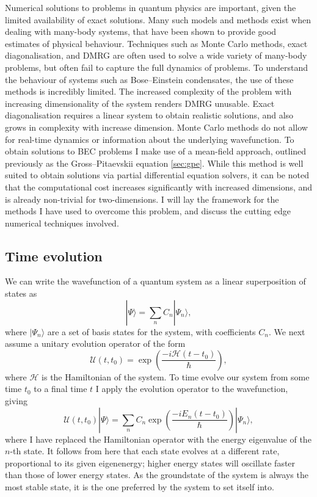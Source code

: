 Numerical solutions to problems in quantum physics are important, given the limited availability of exact solutions. Many such models and methods exist when dealing with many-body systems, that have been shown to provide good estimates of physical behaviour. Techniques such as Monte Carlo methods, exact diagonalisation, and DMRG are often used to solve a wide variety of many-body problems, but often fail to capture the full dynamics of problems. To understand the behaviour of systems such as Bose--Einstein condensates, the use of these methods is incredibly limited. The increased complexity of the problem with increasing dimensionality of the system renders DMRG unusable. Exact diagonalisation requires a linear system to obtain realistic solutions, and also grows in complexity with increase dimension. Monte Carlo methods do not allow for real-time dynamics or information about the underlying wavefunction. To obtain solutions to BEC problems I make use of a mean-field approach, outlined previously as the Gross--Pitaevskii equation \ref{sec:gpe}. While this method is well suited to obtain solutions via partial differential equation solvers, it can be noted that the computational cost increases significantly with increased dimensions, and is already non-trivial for two-dimensions. I will lay the framework for the methods I have used to overcome this problem, and discuss the cutting edge numerical techniques involved.


\subsection{Time evolution}
We can write the wavefunction of a quantum system as a linear superposition of states as
\begin{equation}
    |\Psi \rangle = \displaystyle\sum\limits_{n} C_n |\Psi_n \rangle,
\end{equation}
where $| \Psi_n \rangle$ are a set of basis states for the system, with coefficients $C_n$. We next assume a unitary evolution operator of the form
\begin{equation}
   \mathscr{U}(t,t_0) = \exp\left(\frac{-i\mathcal{H}(t-t_0)}{\hbar}\right),
\end{equation}
where $\mathcal{H}$ is the Hamiltonian of the system. To time evolve our system from some time $t_0$ to a final time $t$ I apply the evolution operator to the wavefunction, giving
\begin{equation}
   \mathscr{U}(t,t_0)|\Psi \rangle = \displaystyle\sum\limits_{n} C_n \exp\left(\frac{-i{E_n}(t-t_0)}{\hbar}\right)|\Psi_n \rangle,
\end{equation}
where I have replaced the Hamiltonian operator with the energy eigenvalue of the $n$-th state. It follows from here that each state evolves at a different rate, proportional to its given eigenenergy; higher energy states will oscillate faster than those of lower energy states. As the groundstate of the system is always the most stable state, it is the one preferred by the system to set itself into.

